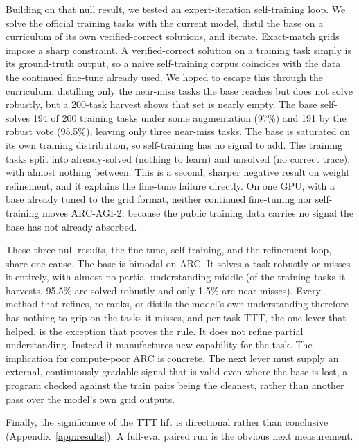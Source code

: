\documentclass[11pt]{article}
\begin{document}
Building on that null result, we tested an expert-iteration self-training loop. We solve the official
training tasks with the current model, distil the base on a curriculum of its own verified-correct
solutions, and iterate. Exact-match grids impose a sharp constraint. A verified-correct solution on a
training task simply is its ground-truth output, so a naive self-training corpus coincides with the
data the continued fine-tune already used. We hoped to escape this through the curriculum, distilling
only the near-miss tasks the base reaches but does not solve robustly, but a 200-task harvest shows
that set is nearly empty. The base self-solves 194 of 200 training tasks under some augmentation
(97\%) and 191 by the robust vote (95.5\%), leaving only three near-miss tasks. The base is saturated
on its own training distribution, so self-training has no signal to add. The training tasks split into
already-solved (nothing to learn) and unsolved (no correct trace), with almost nothing between. This
is a second, sharper negative result on weight refinement, and it explains the fine-tune failure
directly. On one GPU, with a base already tuned to the grid format, neither continued fine-tuning nor
self-training moves ARC-AGI-2, because the public training data carries no signal the base has not
already absorbed.

These three null results, the fine-tune, self-training, and the refinement loop, share one cause. The
base is bimodal on ARC. It solves a task robustly or misses it entirely, with almost no
partial-understanding middle (of the training tasks it harvests, 95.5\% are solved robustly and only
1.5\% are near-misses). Every method that refines, re-ranks, or distils the model's own understanding
therefore has nothing to grip on the tasks it misses, and per-task TTT, the one lever that helped, is
the exception that proves the rule. It does not refine partial understanding. Instead it manufactures new
capability for the task. The implication for compute-poor ARC is concrete. The next lever must supply
an external, continuously-gradable signal that is valid even where the base is lost, a program checked
against the train pairs being the cleanest, rather than another pass over the model's own grid outputs.

Finally, the significance of the TTT lift is directional
rather than conclusive (Appendix~\ref{app:results}). A full-eval paired run is the obvious next
measurement.
\end{document}

